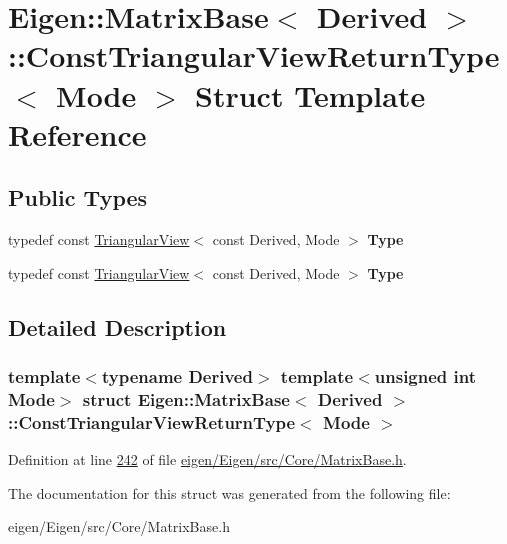 \hypertarget{struct_eigen_1_1_matrix_base_1_1_const_triangular_view_return_type}{}\section{Eigen\+:\+:Matrix\+Base$<$ Derived $>$\+:\+:Const\+Triangular\+View\+Return\+Type$<$ Mode $>$ Struct Template Reference}
\label{struct_eigen_1_1_matrix_base_1_1_const_triangular_view_return_type}
\subsection*{Public Types}
\begin{DoxyCompactItemize}
\item 
\mbox{\label{struct_eigen_1_1_matrix_base_1_1_const_triangular_view_return_type_a40f14663a6e3112a6d9829ba37c7e30d}} 
typedef const \hyperlink{group___core___module_class_eigen_1_1_triangular_view}{Triangular\+View}$<$ const Derived, Mode $>$ {\bfseries Type}
\item 
\mbox{\label{struct_eigen_1_1_matrix_base_1_1_const_triangular_view_return_type_a40f14663a6e3112a6d9829ba37c7e30d}} 
typedef const \hyperlink{group___core___module_class_eigen_1_1_triangular_view}{Triangular\+View}$<$ const Derived, Mode $>$ {\bfseries Type}
\end{DoxyCompactItemize}


\subsection{Detailed Description}
\subsubsection*{template$<$typename Derived$>$\newline
template$<$unsigned int Mode$>$\newline
struct Eigen\+::\+Matrix\+Base$<$ Derived $>$\+::\+Const\+Triangular\+View\+Return\+Type$<$ Mode $>$}



Definition at line \hyperlink{eigen_2_eigen_2src_2_core_2_matrix_base_8h_source_l00242}{242} of file \hyperlink{eigen_2_eigen_2src_2_core_2_matrix_base_8h_source}{eigen/\+Eigen/src/\+Core/\+Matrix\+Base.\+h}.



The documentation for this struct was generated from the following file\+:\begin{DoxyCompactItemize}
\item 
eigen/\+Eigen/src/\+Core/\+Matrix\+Base.\+h\end{DoxyCompactItemize}
